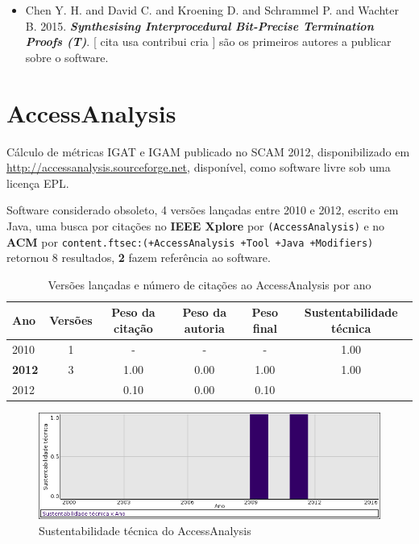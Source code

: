 \begin{itemize}
\item Chen Y. H. and David C. and Kroening D. and Schrammel P. and Wachter B.
      2015.
        \textbf{\textit{ Synthesising Interprocedural Bit-Precise Termination Proofs (T)}}.
      [
          cita
          usa
          contribui
          cria
      ]
são os primeiros autores a publicar sobre o software.
\end{itemize}
\section{AccessAnalysis}

Cálculo de métricas IGAT e IGAM
publicado no SCAM 2012,
disponibilizado em \url{http://accessanalysis.sourceforge.net},
disponível,
como software livre
sob uma licença EPL.

Software considerado obsoleto,
4 versões lançadas
entre 2010 e 2012,
escrito em Java,
uma busca por citações no {\bf IEEE Xplore} por
\texttt{(AccessAnalysis)}
e no {\bf ACM} por
\texttt{content.ftsec:(+AccessAnalysis +Tool +Java +Modifiers)}
retornou
8 resultados,
{\bf 2} fazem referência ao software.


\begin{table}[H]
\caption{Versões lançadas e número de citações ao AccessAnalysis por ano}
\centering
\begin{tabular}{| l | c | c | c | c | c |}
  \hline
  Ano & Versões & Peso da citação & Peso da autoria & Peso final & Sustentabilidade técnica \\
  \hline
        2010 & 1 & - & - & -
        &
          {\color{blue} 1.00}
        \\
\hline
            {\bf 2012}
          &
          3
          &
          1.00
          &
          0.00
          &
          1.00
          &
            {\color{blue} 1.00}
          \\
            2012
          &
          
          &
          0.10
          &
          0.00
          &
          0.10
          &
          \\
\hline
\end{tabular}
\end{table}

\begin{figure}[h]
  \center
  \includegraphics[scale=0.50]{imagens/softwares-charts/accessanalysis.png}
  \caption{Sustentabilidade técnica do AccessAnalysis}
\end{figure}



